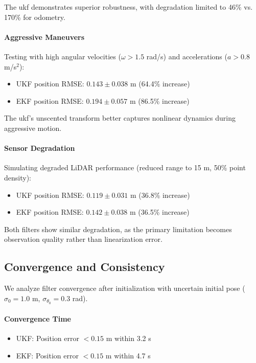 The \acrshort{ukf} demonstrates superior robustness, with degradation limited to 46\% vs. 170\% for odometry.


\paragraph{Aggressive Maneuvers}
Testing with high angular velocities ($\omega > 1.5$ rad/s) and accelerations ($a > 0.8$ m/s$^2$):

\begin{itemize}
    \item UKF position RMSE: $0.143 \pm 0.038$ m (64.4\% increase)
    \item EKF position RMSE: $0.194 \pm 0.057$ m (86.5\% increase)
\end{itemize}

The \acrshort{ukf}'s unscented transform better captures nonlinear dynamics during aggressive motion.

\paragraph{Sensor Degradation}
Simulating degraded LiDAR performance (reduced range to 15 m, 50\% point density):

\begin{itemize}
    \item UKF position RMSE: $0.119 \pm 0.031$ m (36.8\% increase)
    \item EKF position RMSE: $0.142 \pm 0.038$ m (36.5\% increase)
\end{itemize}

Both filters show similar degradation, as the primary limitation becomes observation quality rather than linearization error.

\subsection{Convergence and Consistency}

We analyze filter convergence after initialization with uncertain initial pose ($\sigma_0 = 1.0$ m, $\sigma_{\theta_0} = 0.3$ rad).


\paragraph{Convergence Time}
\begin{itemize}
    \item UKF: Position error $< 0.15$ m within 3.2 s
    \item EKF: Position error $< 0.15$ m within 4.7 s
\end{itemize}

